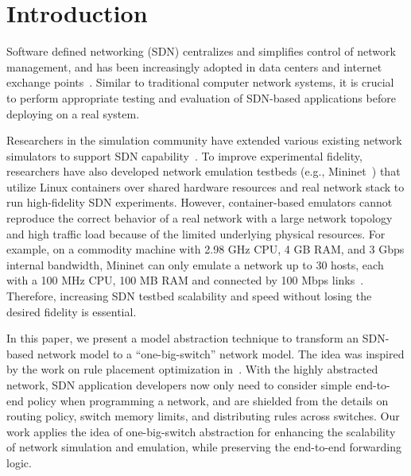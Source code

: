 \section{Introduction}

Software defined networking (SDN) centralizes and simplifies control of network management,
and has been increasingly adopted in data centers and internet exchange points~\cite{B4, Meridian, SDX}.
Similar to traditional computer network systems, it is crucial to perform appropriate testing and evaluation of
SDN-based applications before deploying on a real system.

Researchers in the simulation community have extended various existing network simulators to support SDN capability~\cite{S3F, NS3, OPNET}.
To improve experimental fidelity, researchers have also developed network emulation testbeds
(e.g., Mininet~\cite{Mininet}) that utilize Linux containers over shared hardware resources and
real network stack to run high-fidelity SDN experiments.
However, container-based emulators cannot reproduce the correct behavior of a real network
with a large network topology and high traffic load because of the limited underlying physical resources.
For example, on a commodity machine with 2.98 GHz CPU, 4 GB RAM, and 3 Gbps internal bandwidth,
Mininet can only emulate a network up to 30 hosts, each with a 100 MHz CPU, 100 MB RAM and connected by 100 Mbps links~\cite{ReproNetExprCBE}.
Therefore, increasing SDN testbed scalability and speed without losing the desired fidelity is essential.

In this paper, we present a model abstraction technique to transform an SDN-based network model to a ``one-big-switch'' network model.
The idea was inspired by the work on rule placement optimization in~\cite{OneBigSwitchAbstraction}.
With the highly abstracted network, SDN application developers now only need to consider
simple end-to-end policy when programming a network,
and are shielded from the details on routing policy, switch memory limits,
and distributing rules across switches.
Our work applies the idea of one-big-switch abstraction for enhancing the scalability
of network simulation and emulation, while preserving the end-to-end forwarding logic.

